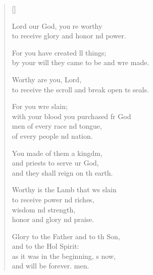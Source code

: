 \settowidth{\versewidth}{to receive the scroll and break open its seals.}
\begin{verse}[\versewidth]
  \begin{patverse}
 Lord our God, you re worthy\Med\\
to receive glory and honor nd power.

For you have created ll things;\Med\\
by your will they came to be and wre made.

Worthy are you,  Lord,\Med\\
to receive the scroll and break open \pointup{\i}ts seals.

For you wre slain;\Med\\
with your blood you purchased fr God\\
men of every race nd tongue,\Med\\
of every people nd nation.

You made of them a kingdm,\Flex\\
and priests to serve ur God,\Med\\
and they shall reign on th earth.

Worthy is the Lamb that ws slain\Med\\
to receive power nd riches,\Med\\
wisdom nd strength,\\
honor and glory nd praise.

Glory to the Father and to th Son,\Med\\
and to the Hol Spirit:\\
as it was in the beginning, \pointup{\i}s now,\Med\\
and will be forever. men.
  \end{patverse}
\end{verse}
